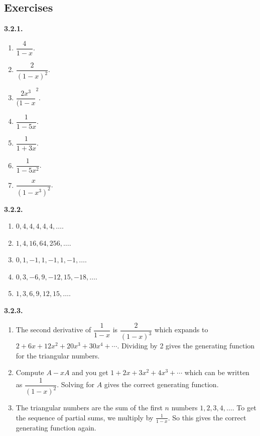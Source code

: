 \documentclass[10pt,]{book}
\theoremstyle{plain}
\theoremstyle{definition}
\theoremstyle{definition}
\theoremstyle{definition}
\theoremstyle{definition}
\numberwithin{equation}{chapter}
\begin{document}
\subsection*{ Exercises}
\noindent\textbf{3.2.1.} \hypertarget{p-1119}{}%
\leavevmode%
\begin{enumerate}[label=(\alph*)]
\item\hypertarget{li-167}{}\(\dfrac{4}{1-x}\).%
\item\hypertarget{li-168}{}\(\dfrac{2}{(1-x)^2}\).%
\item\hypertarget{li-169}{}\(\dfrac{2x^3}{(1-x}^2\).%
\item\hypertarget{li-170}{}\(\dfrac{1}{1-5x}\).%
\item\hypertarget{li-171}{}\(\dfrac{1}{1+3x}\).%
\item\hypertarget{li-172}{}\(\dfrac{1}{1-5x^2}\).%
\item\hypertarget{li-173}{}\(\dfrac{x}{(1-x^3)^2}\).%
\end{enumerate}
%
\par\smallskip
\noindent\textbf{3.2.2.} \hypertarget{p-1122}{}%
\leavevmode%
\begin{enumerate}[label=(\alph*)]
\item\hypertarget{li-179}{}\(0, 4, 4, 4, 4, 4, \ldots\).%
\item\hypertarget{li-180}{}\(1, 4, 16, 64, 256, \ldots\).%
\item\hypertarget{li-181}{}\(0, 1, -1, 1, -1, 1, -1, \ldots\).%
\item\hypertarget{li-182}{}\(0, 3, -6, 9, -12, 15, -18, \ldots\).%
\item\hypertarget{li-183}{}\(1, 3, 6, 9, 12, 15, \ldots\).%
\end{enumerate}
%
\par\smallskip
\noindent\textbf{3.2.3.} \hypertarget{p-1128}{}%
\leavevmode%
\begin{enumerate}[label=(\alph*)]
\item\hypertarget{li-187}{}\hypertarget{p-1129}{}%
The second derivative of \(\dfrac{1}{1-x}\) is \(\dfrac{2}{(1-x)^3}\) which expands to \(2 + 6x + 12x^2 + 20x^3 + 30x^4 + \cdots\).  Dividing by 2 gives the generating function for the triangular numbers.%
\item\hypertarget{li-188}{}\hypertarget{p-1130}{}%
Compute \(A - xA\) and you get \(1 + 2x + 3x^2 + 4x^3 + \cdots\) which can be written as \(\dfrac{1}{(1-x)^2}\).  Solving for \(A\) gives the correct generating function.%
\item\hypertarget{li-189}{}\hypertarget{p-1131}{}%
The triangular numbers are the sum of the first \(n\) numbers  \(1,2,3,4, \ldots\).  To get the sequence of partial sums, we multiply by \(\frac{1}{1-x}\).  So this gives the correct generating function again.%
\end{enumerate}
\end{document}

